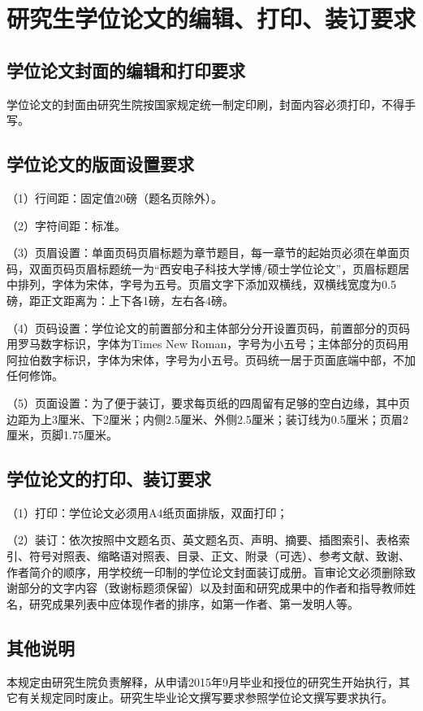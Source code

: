 \chapter{研究生学位论文的编辑、打印、装订要求}
\section{学位论文封面的编辑和打印要求}
学位论文的封面由研究生院按国家规定统一制定印刷，封面内容必须打印，不得手写。
\section{学位论文的版面设置要求}
（1）行间距：固定值20磅（题名页除外）。
\par
（2）字符间距：标准。
\par
（3）页眉设置：单面页码页眉标题为章节题目，每一章节的起始页必须在单面页码，双面页码页眉标题统一为“西安电子科技大学博/硕士学位论文”，页眉标题居中排列，字体为宋体，字号为五号。页眉文字下添加双横线，双横线宽度为0.5 磅，距正文距离为：上下各1磅，左右各4磅。
\par
（4）页码设置：学位论文的前置部分和主体部分分开设置页码，前置部分的页码用罗马数字标识，字体为Times New Roman，字号为小五号；主体部分的页码用阿拉伯数字标识，字体为宋体，字号为小五号。页码统一居于页面底端中部，不加任何修饰。
\par
（5）页面设置：为了便于装订，要求每页纸的四周留有足够的空白边缘，其中页边距为上3厘米、下2厘米；内侧2.5厘米、外侧2.5厘米；装订线为0.5厘米；页眉2厘米，页脚1.75厘米。
\section{学位论文的打印、装订要求}
（1）打印：学位论文必须用A4纸页面排版，双面打印；
\par
（2）装订：依次按照中文题名页、英文题名页、声明、摘要、插图索引、表格索引、符号对照表、缩略语对照表、目录、正文、附录（可选）、参考文献、致谢、作者简介的顺序，用学校统一印制的学位论文封面装订成册。盲审论文必须删除致谢部分的文字内容（致谢标题须保留）以及封面和研究成果中的作者和指导教师姓名，研究成果列表中应体现作者的排序，如第一作者、第一发明人等。
\section{其他说明}
本规定由研究生院负责解释，从申请2015年9月毕业和授位的研究生开始执行，其它有关规定同时废止。研究生毕业论文撰写要求参照学位论文撰写要求执行。
